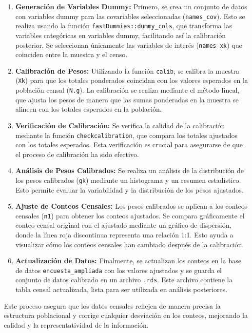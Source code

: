 \documentclass[
  12pt,
]{book}
\begin{document}
\begin{enumerate}
\def\labelenumi{\arabic{enumi}.}
\item
  \textbf{Generación de Variables Dummy:} Primero, se crea un conjunto de datos con variables dummy para las covariables seleccionadas (\texttt{names\_cov}). Esto se realiza usando la función \texttt{fastDummies::dummy\_cols}, que transforma las variables categóricas en variables dummy, facilitando así la calibración posterior. Se seleccionan únicamente las variables de interés (\texttt{names\_xk}) que coinciden entre la muestra y el censo.
\item
  \textbf{Calibración de Pesos:} Utilizando la función \texttt{calib}, se calibra la muestra (\texttt{Xk}) para que los totales ponderados coincidan con los valores esperados en la población censal (\texttt{N.g}). La calibración se realiza mediante el método lineal, que ajusta los pesos de manera que las sumas ponderadas en la muestra se alineen con los totales esperados en la población.
\item
  \textbf{Verificación de Calibración:} Se verifica la calidad de la calibración mediante la función \texttt{checkcalibration}, que compara los totales ajustados con los totales esperados. Esta verificación es crucial para asegurarse de que el proceso de calibración ha sido efectivo.
\item
  \textbf{Análisis de Pesos Calibrados:} Se realiza un análisis de la distribución de los pesos calibrados (\texttt{gk}) mediante un histograma y un resumen estadístico. Esto permite evaluar la variabilidad y la distribución de los pesos ajustados.
\item
  \textbf{Ajuste de Conteos Censales:} Los pesos calibrados se aplican a los conteos censales (\texttt{n1}) para obtener los conteos ajustados. Se compara gráficamente el conteo censal original con el ajustado mediante un gráfico de dispersión, donde la línea roja discontinua representa una relación 1:1. Esto ayuda a visualizar cómo los conteos censales han cambiado después de la calibración.
\item
  \textbf{Actualización de Datos:} Finalmente, se actualizan los conteos en la base de datos \texttt{encuesta\_ampliada} con los valores ajustados y se guarda el conjunto de datos calibrado en un archivo \texttt{.rds}. Este archivo contiene la tabla censal actualizada, lista para ser utilizada en análisis posteriores.
\end{enumerate}

Este proceso asegura que los datos censales reflejen de manera precisa la estructura poblacional y corrige cualquier desviación en los conteos, mejorando la calidad y la representatividad de la información.
\end{document}
